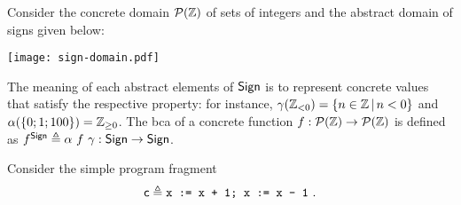 \begin{example}\label{ex:lcla:ext-vs-int}
	Consider the concrete domain $\mathcal{P}(\mathbb{Z})$ of sets of integers and the abstract domain of signs given below:
	\begin{center}
		\texttt{[image: sign-domain.pdf]}
	\end{center}
	The meaning of each abstract elements of $\mathsf{Sign}$ is to represent concrete values that satisfy the respective property: for instance, $\gamma(\mathbb{Z}_{< 0}) = \{ n \in \mathbb{Z} \,\vert\, n < 0 \}$ and $\alpha( \{ 0; 1; 100 \}) = \mathbb{Z}_{\ge 0}$.
	The bca of a concrete function $f: \mathcal{P}(\mathbb{Z}) \to \mathcal{P}(\mathbb{Z})$ is defined as $f^{\mathsf{Sign}}\triangleq \alpha~f~\gamma: \mathsf{Sign} \to \mathsf{Sign}$.

	Consider the simple program fragment
	$$\regc \eqdef \code{x := x + 1; x := x - 1}\ .$$


\end{example}
